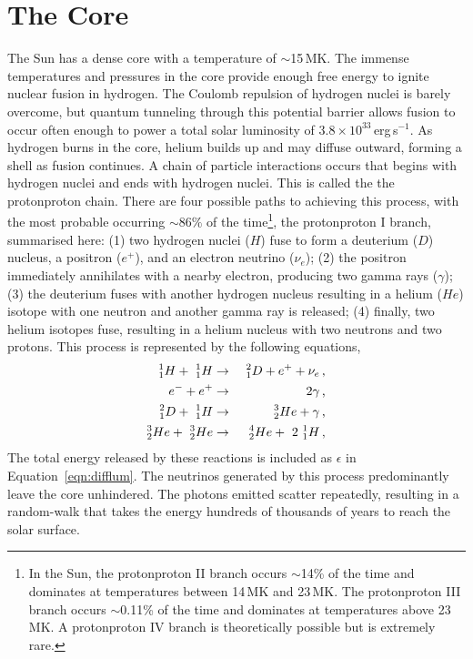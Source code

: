 \section{The Core}\label{sect:thecore}

The Sun has a dense core with a temperature of $\sim$15\,MK. The immense temperatures and pressures in the core provide enough free energy to ignite nuclear fusion in hydrogen. The Coulomb repulsion of hydrogen nuclei is barely overcome, but quantum tunneling through this potential barrier allows fusion to occur often enough to power a total solar luminosity of $3.8\times10^{33}$\,erg\,s$^{-1}$. As hydrogen burns in the core, helium builds up and may diffuse outward, forming a shell as fusion continues. A chain of particle interactions occurs that begins with hydrogen nuclei and ends with hydrogen nuclei. This is called the the \gls{protonproton} chain. There are four possible paths to achieving this process, with the most probable occurring $\sim86\%$ of the time\footnote{In the Sun, the \gls{protonproton} II branch occurs $\sim$14\% of the time and dominates at temperatures between 14\,MK and 23\,MK. The \gls{protonproton} III branch occurs $\sim$0.11\% of the time and dominates at temperatures above 23\,MK. A \gls{protonproton} IV branch is theoretically possible but is extremely rare.}, the \gls{protonproton} I branch, summarised here: 
(1) two hydrogen nuclei ($H$) fuse to form a deuterium ($D$) nucleus, a positron ($e^+$), and an electron neutrino ($\nu_e$);
(2) the positron immediately annihilates with a nearby electron, producing two gamma rays ($\gamma$);
(3) the deuterium fuses with another hydrogen nucleus resulting in a helium ($He$) isotope with one neutron and another gamma ray is released;
(4) finally, two helium isotopes fuse, resulting in a helium nucleus with two neutrons and two protons.
This process is represented by the following equations,
\begin{eqnarray}
^{1}_{1}H +~^{1}_{1}H &\rightarrow&~^{2}_{1}D + e^+ + \nu_e \mbox{\,,} \\
e^- + e^+ &\rightarrow& 2\gamma \mbox{\,,} \\
^{2}_{1}D +~^{1}_{1}H &\rightarrow&~^{3}_{2}He + \gamma \mbox{\,,} \\
^{3}_{2}He +~^{3}_{2}He &\rightarrow&~^{4}_{2}He +~2~^{1}_{1}H \mbox{\,,}
\end{eqnarray}
The total energy released by these reactions is included as $\epsilon$ in Equation~\ref{eqn:difflum}. The neutrinos generated by this process predominantly leave the core unhindered. The photons emitted scatter repeatedly, resulting in a random-walk that takes the energy hundreds of thousands of years to reach the solar surface.%

